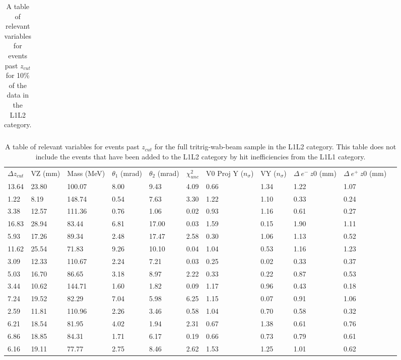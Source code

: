 \begin{table}[t]
\begin{tabular}{lllllllllll}
\hline

\hline
\end{tabular}
\caption{A table of relevant variables for events past $z_{cut}$ for 10\% of the data in the L1L2 category.}
\label{tab:highZ_L1L2_unblind}
\end{table}


\begin{table}[t]
\centering
\tabcolsep=0.09cm
\begin{tabular}{lllllllllll}

\hline

$\Delta z_{cut}$ & VZ (mm) & Mass (MeV) & $\theta_{1}$ (mrad) & $\theta_{2}$ (mrad) & $\chi^2_{unc}$ & V0 Proj Y ($n_{\sigma}$) & VY ($n_{\sigma}$) & $\Delta \ e^- \ z0$ (mm) & $\Delta \ e^+ \ z0$ (mm) \\
13.64 & 23.80 & 100.07 & 8.00 & 9.43 & 4.09 & 0.66 & 1.34 & 1.22 & 1.07 \\ 
1.22 & 8.19 & 148.74 & 0.54 & 7.63 & 3.30 & 1.22 & 1.10 & 0.33 & 0.24 \\ 
3.38 & 12.57 & 111.36 & 0.76 & 1.06 & 0.02 & 0.93 & 1.16 & 0.61 & 0.27 \\ 
16.83 & 28.94 & 83.44 & 6.81 & 17.00 & 0.03 & 1.59 & 0.15 & 1.90 & 1.11 \\ 
5.93 & 17.26 & 89.34 & 2.48 & 17.47 & 2.58 & 0.30 & 1.06 & 1.13 & 0.52 \\ 
11.62 & 25.54 & 71.83 & 9.26 & 10.10 & 0.04 & 1.04 & 0.53 & 1.16 & 1.23 \\ 
3.09 & 12.33 & 110.67 & 2.24 & 7.21 & 0.03 & 0.25 & 0.02 & 0.33 & 0.37 \\ 
5.03 & 16.70 & 86.65 & 3.18 & 8.97 & 2.22 & 0.33 & 0.22 & 0.87 & 0.53 \\ 
3.44 & 10.62 & 144.71 & 1.60 & 1.82 & 0.09 & 1.17 & 0.96 & 0.43 & 0.18 \\ 
7.24 & 19.52 & 82.29 & 7.04 & 5.98 & 6.25 & 1.15 & 0.07 & 0.91 & 1.06 \\ 
2.59 & 11.81 & 110.96 & 2.26 & 3.46 & 0.58 & 1.04 & 0.70 & 0.58 & 0.32 \\ 
6.21 & 18.54 & 81.95 & 4.02 & 1.94 & 2.31 & 0.67 & 1.38 & 0.61 & 0.76 \\ 
6.86 & 18.85 & 84.31 & 1.71 & 6.17 & 0.19 & 0.66 & 0.73 & 0.79 & 0.61 \\ 
6.16 & 19.11 & 77.77 & 2.75 & 8.46 & 2.62 & 1.53 & 1.25 & 1.01 & 0.62 \\ 

\hline

\hline
\end{tabular}
\caption{A table of relevant variables for events past $z_{cut}$ for the full tritrig-wab-beam sample in the L1L2 category. This table does not include the events that have been added to the L1L2 category by hit inefficiencies from the L1L1 category.}
\label{tab:highZ_L1L2_tritrig-wab-beam}
\end{table}


